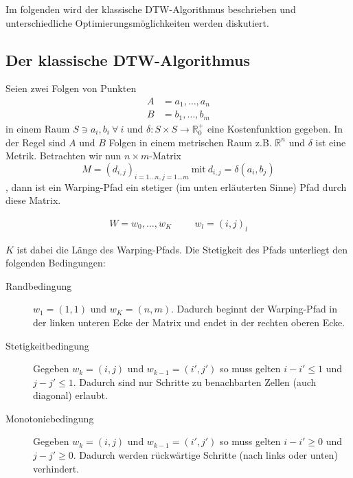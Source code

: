Im folgenden wird der klassische DTW-Algorithmus beschrieben und unterschiedliche Optimierungsmöglichkeiten werden diskutiert.

\subsection{Der klassische DTW-Algorithmus} %
\label{sub:dtw}

Seien zwei Folgen von Punkten
\begin{align}
  \label{eqn:a}
  A &= a_1, \dots, a_n \\
  \label{eqn:b}
  B &= b_1, \dots, b_m
\end{align}
in einem Raum \( S \ni a_i, b_i ~\forall~i \) und %
\( \delta : S\times S \rightarrow \mathbb{R}_0^+ \) eine Kostenfunktion
gegeben. In der Regel sind \(A\) und \(B\) Folgen in einem metrischen Raum z.B. \(\mathbb{R}^n\) und \(\delta\) ist eine Metrik.
Betrachten wir nun \( n\times m\)-Matrix
\begin{equation} \label{eqn:matrix}
  M = (d_{i,j})_{i=1\dots n, j=1\dots m} ~\text{mit}~ d_{i,j} = \delta(a_i,b_j)
\end{equation}
, dann ist ein Warping-Pfad ein stetiger (im unten erläuterten Sinne) Pfad durch diese Matrix.

\begin{align}
  W = w_0,\dots,w_K \hspace{1cm} w_l = (i,j)_l
\end{align}

$K$ ist dabei die Länge des Warping-Pfads. Die Stetigkeit des Pfads unterliegt den folgenden Bedingungen:

\begin{description}
  \item[Randbedingung] \( w_1 = (1,1) \) und \( w_K = (n,m) \). Dadurch beginnt der Warping-Pfad in der linken unteren Ecke der Matrix und endet in der rechten oberen Ecke.
  \item[Stetigkeitbedingung] Gegeben \( w_k = (i,j) \) und \( w_{k-1} = (i',j') \) so muss gelten \( i-i' \leqslant 1 \) und \( j-j' \leqslant 1 \). Dadurch sind nur Schritte zu benachbarten Zellen (auch diagonal) erlaubt.
  \item[Monotoniebedingung] Gegeben \( w_k = (i,j) \) und \( w_{k-1} = (i',j') \) so muss gelten \( i-i' \geqslant 0 \) und \( j-j' \geqslant 0 \). Dadurch werden rückwärtige Schritte (nach links oder unten) verhindert.
\end{description}


